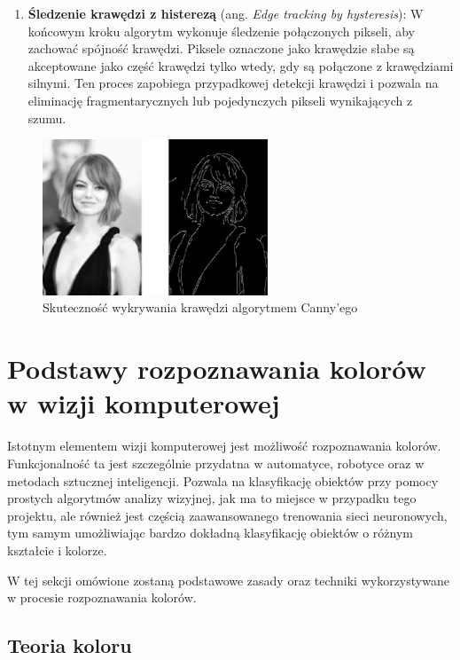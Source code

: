 \begin{enumerate}
    \item \textbf{Śledzenie krawędzi z histerezą} (ang. \textit{Edge tracking by hysteresis}): W końcowym kroku algorytm wykonuje śledzenie połączonych pikseli, aby zachować spójność krawędzi. Piksele oznaczone jako krawędzie słabe są akceptowane jako część krawędzi tylko wtedy, gdy są połączone z krawędziami silnymi. Ten proces zapobiega przypadkowej detekcji krawędzi i pozwala na eliminację fragmentarycznych lub pojedynczych pikseli wynikających z szumu.
\end{enumerate}


\begin{figure}[H]
    \centering
    \includegraphics[width=0.6\textwidth]{./graf/canny-edge.png}
    \caption{Skuteczność wykrywania krawędzi algorytmem Canny'ego}
    \label{img:canny-sample}
\end{figure}

\clearpage

\section{Podstawy rozpoznawania kolorów w wizji komputerowej}

Istotnym elementem wizji komputerowej jest możliwość rozpoznawania kolorów. Funkcjonalność ta jest szczególnie przydatna w automatyce, robotyce oraz w metodach sztucznej inteligencji. Pozwala na klasyfikację obiektów przy pomocy prostych algorytmów analizy wizyjnej, jak ma to miejsce w przypadku tego projektu, ale również jest częścią zaawansowanego trenowania sieci neuronowych, tym samym umożliwiając bardzo dokładną klasyfikację obiektów o różnym kształcie i kolorze. 

W tej sekcji omówione zostaną podstawowe zasady oraz techniki wykorzystywane w procesie rozpoznawania kolorów.


\subsection{Teoria koloru}

